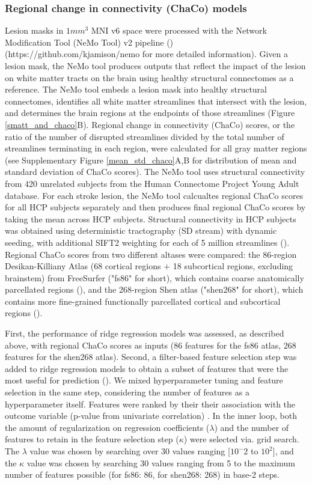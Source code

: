 \documentclass[phd,tocprelim]{cornell}
\def\Plus{\texttt{+}}
\begin{document}
\subsubsection*{Regional change in connectivity (ChaCo) models}
Lesion masks in $1mm^3$ MNI v6 space were processed with the Network Modification Tool (NeMo Tool) v2 pipeline (\cite{Kuceyeski2013-nk}) (https://github.com/kjamison/nemo for more detailed information). Given a lesion mask, the NeMo tool produces outputs that reflect the impact of the lesion on white matter tracts on the brain using healthy structural connectomes as a reference. The NeMo tool embeds a lesion mask into healthy structural connectomes, identifies all white matter streamlines that intersect with the lesion, and determines the brain regions at the endpoints of those streamlines (Figure \ref{smatt_and_chaco}B). Regional change in connectivity (ChaCo) scores, or the ratio of the number of disrupted streamlines divided by the total number of streamlines terminating in each region, were calculated for all gray matter regions (see Supplementary Figure \ref{mean_std_chaco}A,B for distribution of mean and standard deviation of ChaCo scores). The NeMo tool uses structural connectivity from 420 unrelated subjects from the Human Connectome Project Young Adult database. For each stroke lesion, the NeMo tool calcualtes regional ChaCo scores for all HCP subjects separately and then produces final regional ChaCo scores by taking the mean across HCP subjects. Structural connectivity in HCP subjects was obtained using deterministic tractography (SD stream) with dynamic seeding, with additional SIFT2 weighting for each of 5 million streamlines (\cite{Smith2015-eb}). Regional ChaCo scores from two different altases were compared: the 86-region Desikan-Killiany Atlas (68 cortical regions $\Plus$ 18 subcortical regions, excluding brainstem) from FreeSurfer ("fs86" for short), which contains coarse anatomically parcellated regions (\cite{Desikan2006-vf,Fischl2002-lb}), and the 268-region Shen atlas ("shen268" for short), which contains more fine-grained functionally parcellated cortical and subcortical regions (\cite{Shen2013-zn}).

First, the performance of ridge regression models was assessed, as described above, with regional ChaCo scores as inputs (86 features for the fs86 atlas, 268 features for the shen268 atlas). Second, a filter-based feature selection step was added to ridge regression models to obtain a subset of features that were the most useful for prediction (\cite{Guyon2003-kj, Hall1999-qr, Pudjihartono2022-zg}). We mixed hyperparameter tuning and feature selection in the same step, considering the number of features as a hyperparameter itself. Features were ranked by their their association with the outcome variable (p-value from univariate correlation) . In the inner loop, both the amount of regularization on regression coefficients ($\lambda$) and the number of features to retain in the feature selection step ($\kappa$) were selected via. grid search. The $\lambda$ value was chosen by searching over 30 values ranging [$10^-2$ to $10^2$], and the $\kappa$ value was chosen by searching 30 values ranging from 5 to the maximum number of features possible (for fs86: 86, for shen268: 268) in base-2 steps. 
\end{document}
